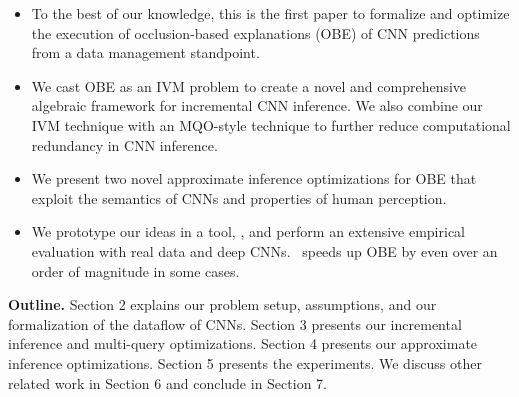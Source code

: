 \vspace{-4mm}
\begin{itemize}
	\item To the best of our knowledge, this is the first paper to formalize and optimize the execution of occlusion-based explanations (OBE) of CNN predictions from a data management standpoint.

	\item We cast OBE as an IVM problem to create a novel and comprehensive algebraic framework for incremental CNN inference. We also combine our IVM technique with an MQO-style technique to further reduce computational redundancy in CNN inference.

	\item We present two novel approximate inference optimizations for OBE that exploit the semantics of CNNs and properties of human perception.

	\item We prototype our ideas in a tool, \system, and perform an extensive empirical evaluation with real data and deep CNNs. \system ~speeds up OBE by even over an order of magnitude in some cases.

\end{itemize}

\vspace{-4mm}
\noindent \textbf{Outline.} 
Section 2 explains our problem setup, assumptions, and our formalization of the dataflow of CNNs. Section 3 presents our incremental inference and multi-query optimizations. Section 4 presents our approximate inference optimizations. Section 5 presents the experiments. We discuss other related work in Section 6 and conclude in Section 7.
